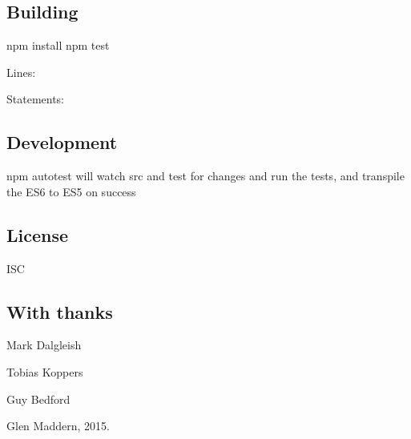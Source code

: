 \subsection*{Building}


\begin{DoxyCode}
npm install
npm test
\end{DoxyCode}


\href{https://travis-ci.org/css-modules/postcss-modules-scope}{\tt }


\begin{DoxyItemize}
\item Lines\+: \href{https://coveralls.io/r/css-modules/postcss-modules-scope?branch=master}{\tt }
\item Statements\+: \href{http://codecov.io/github/css-modules/postcss-modules-scope?branch=master}{\tt }
\end{DoxyItemize}

\subsection*{Development}


\begin{DoxyItemize}
\item {\ttfamily npm autotest} will watch {\ttfamily src} and {\ttfamily test} for changes and run the tests, and transpile the E\+S6 to E\+S5 on success
\end{DoxyItemize}

\subsection*{License}

I\+SC

\subsection*{With thanks}


\begin{DoxyItemize}
\item Mark Dalgleish
\item Tobias Koppers
\item Guy Bedford 

 Glen Maddern, 2015. 
\end{DoxyItemize}